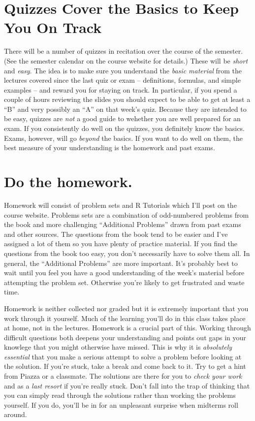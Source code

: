 \documentclass[12pt,letterpaper]{article}
\begin{document}
\section{Quizzes Cover the Basics to Keep You On Track}
There will be a number of quizzes in recitation over the course of the semester.
(See the semester calendar on the course website for details.)
These will be \emph{short} and \emph{easy}.
The idea is to make sure you understand the \emph{basic material} from the lectures covered since the last quiz or exam -- definitions, formulas, and simple examples -- and reward you for staying on track.
In particular, if you spend a couple of hours reviewing the slides you should expect to be able to get at least a ``B'' and very possibly an ``A'' on that week's quiz.
Because they are intended to be easy, quizzes are \emph{not} a good guide to wehether you are well prepared for an exam.
If you consistently do well on the quizzes, you definitely know the basics.
Exams, however, will go \emph{beyond} the basics.
If you want to do well on them, the best measure of your understanding is the homework and past exams.


\section{Do the homework.}
Homework will consist of problem sets and R Tutorials which I'll post on the course website. 
Problems sets are a combination of odd-numbered problems from the book and more challenging ``Additional Problems'' drawn from past exams and other sources. 
The questions from the book tend to be easier and I've assigned a lot of them so you have plenty of practice material.
If you find the questions from the book too easy, you don't necessarily have to solve them all.
In general, the ``Additional Problems'' are more important.
It's probably best to wait until you feel you have a good understanding of the week's material before attempting the problem set. 
Otherwise you're likely to get frustrated and waste time.

Homework is neither collected nor graded but it is extremely important that you work through it yourself. 
Much of the learning you'll do in this class takes place at home, not in the lectures.
Homework is a crucial part of this.
Working through difficult questions both deepens your understanding and points out gaps in your knowlege that you might otherwise have missed.
This is why it is \emph{absolutely essential} that you make a serious attempt to solve a problem before looking at the solution.
If you're stuck, take a break and come back to it.
Try to get a hint from Piazza or a classmate.
The solutions are there for you to \emph{check your work} and as a \emph{last resort} if you're really stuck.
Don't fall into the trap of thinking that you can simply read through the solutions rather than working the problems yourself.
If you do, you'll be in for an unpleasant surprise when midterms roll around.
\end{document}
